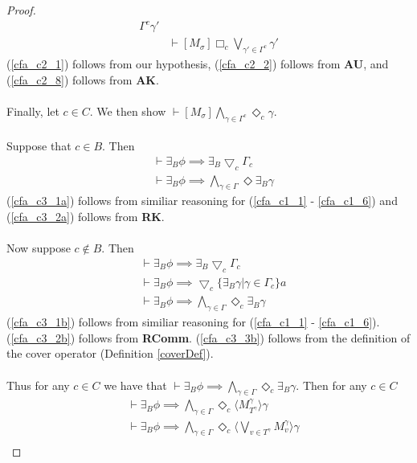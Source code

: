 \documentclass[12pt, a4paper, titlepage]{scrartcl}
\numberwithin{equation}{section}
\newcommand{\cover}{\bigtriangledown}
\newcommand{\sqex}[1]{[{#1}]}
\newcommand{\anex}[1]{\langle {#1} \rangle}
\newcommand{\axAK}{{\bf AK}}
\newcommand{\axAU}{{\bf AU}}
\newcommand{\axRK}{{\bf RK}}
\newcommand{\axRComm}{{\bf RComm}}
\begin{document}
\begin{proof}
\begin{align}
{		\Gamma^c} \gamma'\label{cfa_c2_7} \\
	& \vdash \sqex{M_\sigma} \Box_c \bigvee_{\gamma' \in \Gamma^c} \gamma'\label{cfa_c2_8} 
\end{align}
(\ref{cfa_c2_1}) follows from our hypothesis, (\ref{cfa_c2_2}) follows from \axAU, and (\ref{cfa_c2_8})
	follows from \axAK.\\
\\
Finally, let $c \in C$. We then show $\vdash \sqex{M_\sigma}\bigwedge_{\gamma \in \Gamma^c}
\Diamond_c \gamma$.\\
\\
Suppose that $c \in B$.
Then
\begin{align}
	& \vdash \exists_B \phi \implies \exists_B \cover_c \Gamma_c \label{cfa_c3_1a}\\
	& \vdash \exists_B \phi \implies \bigwedge_{\gamma \in \Gamma} \Diamond \exists_B
	\gamma\label{cfa_c3_2a}
\end{align}
(\ref{cfa_c3_1a}) follows from similiar reasoning for (\ref{cfa_c1_1} - \ref{cfa_c1_6}) and
(\ref{cfa_c3_2a}) follows from \axRK.\\
\\
Now suppose $c \notin B$.
Then
\begin{align}
	& \vdash \exists_B \phi \implies \exists_B \cover_c \Gamma_c \label{cfa_c3_1b}\\
	& \vdash \exists_B \phi \implies \cover_c \{\exists_B \gamma | \gamma \in \Gamma_c \}a
	\label{cfa_c3_2b}\\
	& \vdash \exists_B \phi \implies \bigwedge_{\gamma \in \Gamma} \Diamond_c \exists_B \gamma
	\label{cfa_c3_3b}
\end{align}
(\ref{cfa_c3_1b}) follows from similiar reasoning for (\ref{cfa_c1_1} - \ref{cfa_c1_6}).
(\ref{cfa_c3_2b}) follows from \axRComm.
(\ref{cfa_c3_3b}) follows from the definition of the cover operator (Definition \ref{coverDef}).\\
\\
Thus for any $c \in C$ we have that $\vdash \exists_B \phi \implies \bigwedge_{\gamma \in \Gamma}
\Diamond_c \exists_B \gamma$.
Then for any $c \in C$
\begin{align}
	& \vdash \exists_B \phi \implies \bigwedge_{\gamma \in \Gamma} \Diamond_c \anex{
	M^\gamma_{T^{\gamma}} } \gamma\label{cfa_c3_3}\\
	& \vdash \exists_B \phi \implies \bigwedge_{\gamma \in \Gamma} \Diamond_c \anex{
	\bigvee_{v \in T^\gamma} M^\gamma_{v} } \gamma\label{cfa_c3_4}\\

\end{align}
\end{proof}
\end{document}
